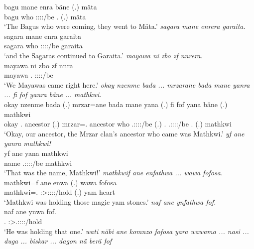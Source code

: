 \begin{exe}
	\gll bagu mane enra bäne (.) mäta\\ 
	bagu who \Stpl:\Sbj:\Pst:\Ipfv:\Venit/be \Recog.{\Abs} (.) mäta\\
	\trans `The Bagus who were coming, they went to Mäta.'
	\emph{sagara mane enrera garaita.}\\
	\gll sagara mane enra garaita\\ 
	sagara who \Stpl:\Sbj:\Pst:\Ipfv:\Venit/be garaita\\
	\trans `and the Sagaras continued to Garaita.'
	\emph{mayawa ni zbo zf nnrera.}\\
	\gll mayawa ni zbo zf nnra\\ 
	mayawa {\Fnsg} \Prox.{\All} {\Imm} \Fpl:\Sbj:\Pst:\Ipfv:\Venit/be\\
	\trans `We Mayawas came right here.'
	\emph{okay nzenme bada ... mrzarane bada mane yanra ... fi fof yanra bäne ... mathkwi.}\\
	\gll okay nzenme bada (.) mrzar=ane bada mane yana (.) fi fof yana bäne (.) mathkwi\\ 
	okay \Fnsg.{\Poss} ancestor (.) mrzar=\Poss.{\Sg} ancestor who \Tsg.\Masc:\Sbj:\Pst:\Ipfv:\Venit/be (.) \Third.{\Abs} {\Emph} \Tsg.\Masc:\Sbj:\Pst:\Ipfv:\Venit/be \Recog.{\Abs} (.) mathkwi\\
	\trans `Okay, our ancestor, the Mrzar clan's ancestor who came was Mathkwi.'
	\emph{yf ane yanra mathkwi!}\\
	\gll yf ane yana mathkwi\\ 
	name {\Dem} \Tsg.\Masc:\Sbj:\Pst:\Ipfv:\Venit/be mathkwi\\
	\trans `That was the name, Mathkwi!'
	\emph{mathkwif ane enfathwa ... wawa fofosa.}\\
	\gll mathkwi=f ane enwa (.) wawa fofosa\\ 
	mathkwi=\Erg.{\Sg} {\Dem} \Sg:\Sbj>\Stpl:\Obj:\Pst:\Ipfv:\Venit/hold (.) yam heart\\
	\trans `Mathkwi was holding those magic yam stones.'
	\emph{naf ane ynfathwa fof.}\\
	\gll naf ane ynwa fof.\\ 
	\Tsg.{\Erg} {\Dem} \Sg:\Sbj>\Tsg.\Masc:\Obj:\Pst:\Ipfv:\Venit/hold \Emph\\
	\trans `He was holding that one.'
	\emph{wati näbi ane komnzo fofosa yara wawama ... nasi ... duga ... biskar ... dagon nä berä fof}\\

\end{exe}
